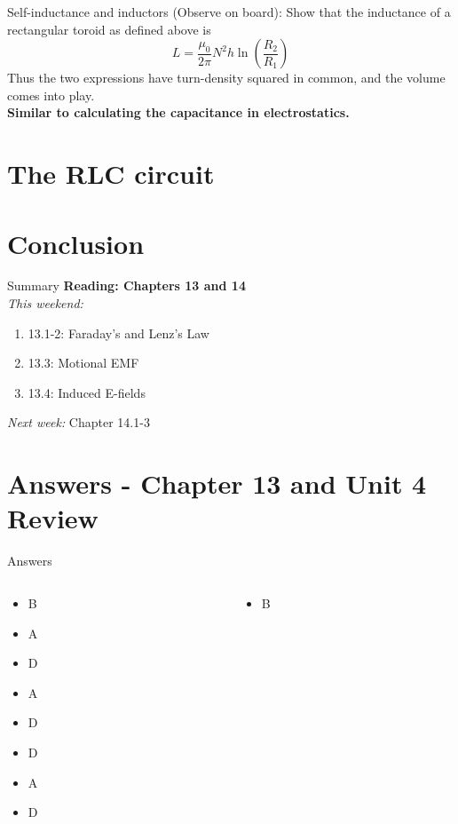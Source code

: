 \documentclass{beamer}
\begin{document}
\begin{frame}{Self-inductance and inductors}
(Observe on board): Show that the inductance of a rectangular toroid as defined above is
\begin{equation}
L = \frac{\mu_0}{2\pi}N^2 h \ln\left(\frac{R_2}{R_1}\right)
\end{equation}
Thus the two expressions have turn-density squared in common, and the volume comes into play. \\
\textbf{Similar to calculating the capacitance in electrostatics.}
\end{frame}

\section{The RLC circuit}

\section{Conclusion}

\begin{frame}{Summary}
\textbf{Reading: Chapters 13 and 14} \\ \vspace{0.5cm}
\textit{This weekend:}
\begin{enumerate}
\item 13.1-2: Faraday's and Lenz's Law
\item 13.3: Motional EMF
\item 13.4: Induced E-fields
\end{enumerate}
\textit{Next week:} Chapter 14.1-3
\end{frame}

\section{Answers - Chapter 13 and Unit 4 Review}

\begin{frame}{Answers}
\small
\begin{columns}[T]
\begin{column}{0.5\textwidth}
\begin{itemize}
\item B
\item A
\item D
\item A
\item D
\item D
\item A
\item D
\end{itemize}
\end{column}
\begin{column}{0.5\textwidth}
\begin{itemize}
\item B
\end{itemize}
\end{column}
\end{columns}
\end{frame}
\end{document}
